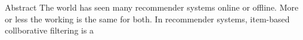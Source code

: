 \centering
\large{Abstract}
The world has seen many recommender systems online or offline. More or less the working is the same for both. In recommender systems, item-based collborative filtering is a
    

